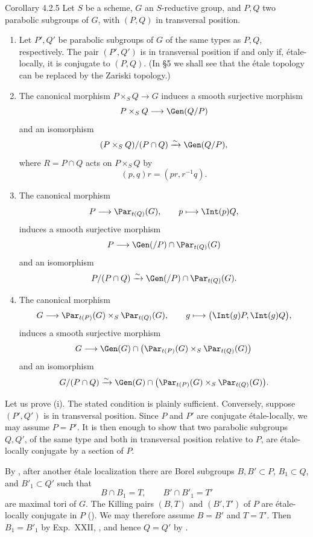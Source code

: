 \begin{sgastatement}{Corollary 4.2.5}
Let \(S\) be a scheme, \(G\) an \(S\)-reductive group, and \(P,Q\) two
parabolic subgroups of \(G\), with \((P,Q)\) in transversal position.
\begin{enumerate}[label=\textup{(\roman*)}]
\item Let \(P',Q'\) be parabolic subgroups of \(G\) of the same types as
\(P,Q\), respectively.  The pair \((P',Q')\) is in transversal position
if and only if, étale-locally, it is conjugate to \((P,Q)\).
\textup{(In §5 we shall see that the étale topology can be replaced by
the Zariski topology.)}
\item The canonical morphism \(P\times_SQ\to G\) induces a smooth
surjective morphism
\[
 P\times_SQ\longrightarrow\Gen(Q/P)
\]
and an isomorphism
\[
 (P\times_SQ)/(P\cap Q)\xrightarrow{\sim}\Gen(Q/P),
\]
where \(R=P\cap Q\) acts on \(P\times_SQ\) by
\[
 (p,q)r=(pr,r^{-1}q).
\]
\item The canonical morphism
\[
 P\longrightarrow\Par_{t(Q)}(G),\qquad p\longmapsto\Int(p)Q,
\]
induces a smooth surjective morphism
\[
 P\longrightarrow\Gen(/P)\cap\Par_{t(Q)}(G)
\]
and an isomorphism
\[
 P/(P\cap Q)\xrightarrow{\sim}
 \Gen(/P)\cap\Par_{t(Q)}(G).
\]
\item The canonical morphism
\[
 G\longrightarrow\Par_{t(P)}(G)\times_S\Par_{t(Q)}(G),\qquad
 g\longmapsto\bigl(\Int(g)P,\Int(g)Q\bigr),
\]
induces a smooth surjective morphism
\[
 G\longrightarrow
 \Gen(G)\cap
 \bigl(\Par_{t(P)}(G)\times_S\Par_{t(Q)}(G)\bigr)
\]
and an isomorphism
\[
 G/(P\cap Q)\xrightarrow{\sim}
 \Gen(G)\cap
 \bigl(\Par_{t(P)}(G)\times_S\Par_{t(Q)}(G)\bigr).
\]
\end{enumerate}
\end{sgastatement}

\SGAProof
Let us prove \textup{(i)}.  The stated condition is plainly sufficient.
Conversely, suppose \((P',Q')\) is in transversal position.  Since
\(P\) and \(P'\) are conjugate étale-locally, we may assume \(P=P'\).
It is then enough to show that two parabolic subgroups \(Q,Q'\), of the
same type and both in transversal position relative to \(P\), are
étale-locally conjugate by a section of \(P\).

By \textup{}, after another étale localization there are Borel
subgroups \(B,B'\subset P\), \(B_1\subset Q\), and \(B'_1\subset Q'\)
such that
\[
 B\cap B_1=T,\qquad B'\cap B'_1=T'
\]
are maximal tori of \(G\).  The Killing pairs \((B,T)\) and
\((B',T')\) of \(P\) are étale-locally conjugate in \(P\) ().
We may therefore assume \(B=B'\) and \(T=T'\).  Then
\(B_1=B'_1\) by Exp.\ XXII, , and hence \(Q=Q'\) by .

